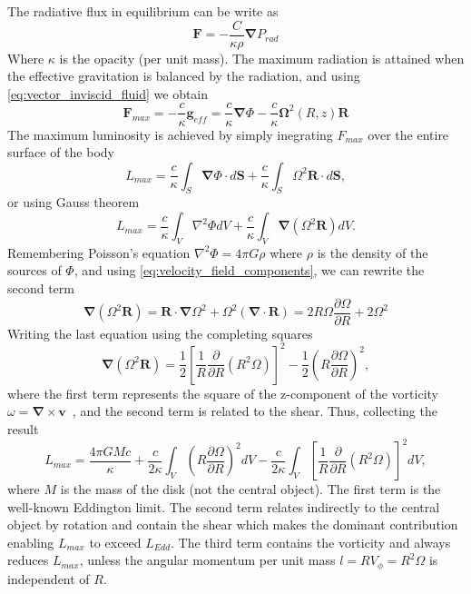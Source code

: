 \documentclass[a4paper,modern]{aastex62}
\renewcommand{\vec}[1]{\mathbf{#1}}
\begin{document}
The radiative flux in equilibrium can be write as
\begin{equation}
\mathbf{F}= -\frac{C}{\kappa \rho}\mathbf{\nabla}P_{rad}
\end{equation}
Where $\kappa$ is the opacity (per unit mass).
The maximum radiation is attained when the effective gravitation is balanced by the radiation, and using \ref{eq:vector_inviscid_fluid} we obtain
\begin{equation}\label{eq:Fmax-rad}
    \vec F_{max} = -\frac{c}{\kappa}\vec g_{eff} = \frac{c}{\kappa}\vec\nabla\Phi - \frac{c}{\kappa}\vec \Omega^2(R,z)\vec R
\end{equation}
The maximum luminosity is achieved by simply inegrating $F_{max}$ over the entire surface of the body
\begin{equation}
    L_{max} = \frac{c}{\kappa} \int_S \vec\nabla\Phi\cdot d\vec S + \frac{c}{\kappa}\int_S \Omega^2\vec R \cdot d\vec S ,
\end{equation}
or using Gauss theorem 
\begin{equation}
    L_{max} = \frac{c}{\kappa} \int_V \nabla^2\Phi dV + \frac{c}{\kappa}\int_V \vec\nabla(\Omega^2\vec R) dV.
\end{equation}
Remembering Poisson's equation $\nabla^2\Phi=4\pi G \rho$ where $\rho$ is the density of the sources of $\Phi$, and using \ref{eq:velocity_field_components}, we can rewrite the second term 
\begin{equation}
    \vec\nabla(\Omega^2\vec R) = \vec R \cdot \vec\nabla\Omega^2 + \Omega^2(\vec\nabla\cdot\vec R) = 2R\Omega \frac{\partial\Omega}{\partial R} + 2\Omega^2
\end{equation}
Writing the last equation using the completing squares
\begin{equation}
    \vec\nabla(\Omega^2\vec R) = \frac{1}{2}\left[ \frac{1}{R}\frac{\partial}{\partial R}(R^2\Omega) \right]^2 - \frac{1}{2} \left( R\frac{\partial \Omega}{\partial R} \right)^2 ,
\end{equation}
where the first term represents the square of the z-component of the vorticity \mbox{ $\omega = \mathbf{\nabla} \times \mathbf{v}$ }, and the second term is related to the shear.
Thus, collecting the result
\begin{equation}
    L_{max}=\frac{4\pi G M c}{\kappa}+
    \frac{c}{2\kappa}\int_V \left( R\frac{\partial \Omega}{\partial R} \right)^2 dV -
    \frac{c}{2\kappa}\int_V \left[ \frac{1}{R}\frac{\partial}{\partial R}(R^2\Omega) \right]^2 dV, 
\end{equation}
where $M$ is the mass of the disk (not the central object).
The first term is the well-known Eddington limit.
The second term relates indirectly to the central object by rotation and contain the shear which makes the dominant contribution enabling $L_{max}$ to exceed $L_{Edd}$. The third term contains the vorticity and always reduces $L_{max}$, unless the angular momentum per unit mass $l=RV_\phi=R^2\Omega$ is independent of $R$.
\end{document}
